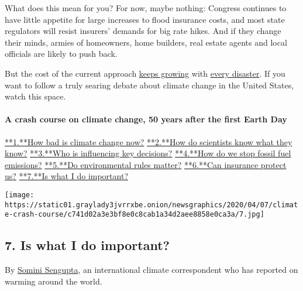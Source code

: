What does this mean for you? For now, maybe nothing: Congress continues
to have little appetite for large increases to flood insurance costs,
and most state regulators will resist insurers' demands for big rate
hikes. And if they change their minds, armies of homeowners, home
builders, real estate agents and local officials are likely to push
back.

But the cost of the current approach
\href{https://www.nytimes3xbfgragh.onion/2019/12/04/climate/florida-keys-climate-change.html}{keeps
growing} with
\href{https://www.nytimes3xbfgragh.onion/2020/03/11/climate/government-land-eviction-floods.html}{every
disaster}. If you want to follow a truly searing debate about climate
change in the United States, watch this space.

\hypertarget{a-crash-course-on-climate-change-50-years-after-the-first-earth-day-6}{%
\paragraph{A crash course on climate change, 50 years after the first
Earth
Day}\label{a-crash-course-on-climate-change-50-years-after-the-first-earth-day-6}}

\href{/interactive/2020/04/19/climate/climate-crash-course-1.html}{**1.**How
bad is climate change now?}
\href{/interactive/2020/04/19/climate/climate-crash-course-2.html}{**2.**How
do scientists know what they know?}
\href{/interactive/2020/04/19/climate/climate-crash-course-3.html}{**3.**Who
is influencing key decisions?}
\href{/interactive/2020/04/19/climate/climate-crash-course-4.html}{**4.**How
do we stop fossil fuel emissions?}
\href{/interactive/2020/04/19/climate/climate-crash-course-5.html}{**5.**Do
environmental rules matter?}
\href{/interactive/2020/04/19/climate/climate-crash-course-6.html}{**6.**Can
insurance protect us?}
\href{/interactive/2020/04/19/climate/climate-crash-course-7.html}{**7.**Is
what I do important?}

\texttt{[image: https://static01.graylady3jvrrxbe.onion/newsgraphics/2020/04/07/climate-crash-course/c741d02a3e3bf8e0c8cab1a34d2aee8858e0ca3a/7.jpg]}

\hypertarget{7-is-what-i-do-important}{%
\subsection{\texorpdfstring{\textbf{7.} Is what I do
important?}{7. Is what I do important?}}\label{7-is-what-i-do-important}}

By \href{https://www.nytimes3xbfgragh.onion/by/somini-sengupta}{Somini
Sengupta}, an international climate correspondent who has reported on
warming around the world.

